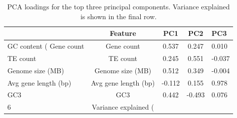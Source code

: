 \begin{table}
\caption{PCA loadings for the top three principal components. Variance explained is shown in the final row.}
\label{tab:pca_loadings}
\begin{tabular}{lccc}
\toprule
 & Feature & PC1 & PC2 & PC3 \\
\midrule
GC content (%
Gene count & Gene count & 0.537 & 0.247 & 0.010 \\
TE count & TE count & 0.245 & 0.551 & -0.037 \\
Genome size (MB) & Genome size (MB) & 0.512 & 0.349 & -0.004 \\
Avg gene length (bp) & Avg gene length (bp) & -0.112 & 0.155 & 0.978 \\
GC3 & GC3 & 0.442 & -0.493 & 0.076 \\
6 & Variance explained (%
\bottomrule
\end{tabular}
\end{table}
